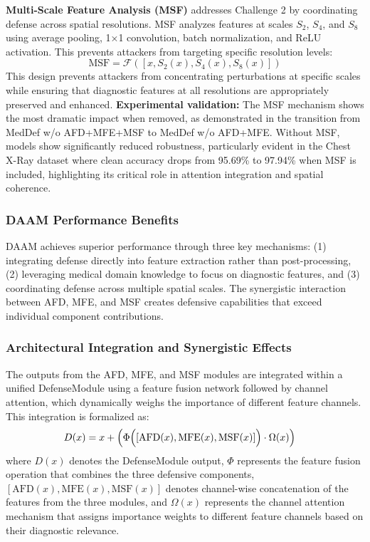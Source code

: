 \documentclass[preprint,12pt]{elsarticle}
\begin{document}
\textbf{Multi-Scale Feature Analysis (MSF)} addresses Challenge 2 by coordinating defense across spatial resolutions. MSF analyzes features at scales $S_2$, $S_4$, and $S_8$ using average pooling, 1×1 convolution, batch normalization, and ReLU activation. This prevents attackers from targeting specific resolution levels:
\begin{equation}
\text{MSF} = \mathcal{F}([x, S_2(x), S_4(x), S_8(x)])
\end{equation}
This design prevents attackers from concentrating perturbations at specific scales while ensuring that diagnostic features at all resolutions are appropriately preserved and enhanced. \textbf{Experimental validation:} The MSF mechanism shows the most dramatic impact when removed, as demonstrated in the transition from MedDef w/o AFD+MFE+MSF to MedDef w/o AFD+MFE. Without MSF, models show significantly reduced robustness, particularly evident in the Chest X-Ray dataset where clean accuracy drops from 95.69\% to 97.94\% when MSF is included, highlighting its critical role in attention integration and spatial coherence.

\subsubsection{DAAM Performance Benefits}
DAAM achieves superior performance through three key mechanisms: (1) integrating defense directly into feature extraction rather than post-processing, (2) leveraging medical domain knowledge to focus on diagnostic features, and (3) coordinating defense across multiple spatial scales. The synergistic interaction between AFD, MFE, and MSF creates defensive capabilities that exceed individual component contributions.

\subsubsection{Architectural Integration and Synergistic Effects}
The outputs from the AFD, MFE, and MSF modules are integrated within a unified DefenseModule using a feature fusion network followed by channel attention, which dynamically weighs the importance of different feature channels. This integration is formalized as:
\begin{align}
D(x) &= x + \Bigl(
\Phi\Bigl([\text{AFD}(x), \text{MFE}(x), \text{MSF}(x)]\Bigr)\cdot\Omega(x)\Bigr)
\end{align}
where $D(x)$ denotes the DefenseModule output, $\Phi$ represents the feature fusion operation that combines the three defensive components, $[\text{AFD}(x), \text{MFE}(x), \text{MSF}(x)]$ denotes channel-wise concatenation of the features from the three modules, and $\Omega(x)$ represents the channel attention mechanism that assigns importance weights to different feature channels based on their diagnostic relevance.
\end{document}

